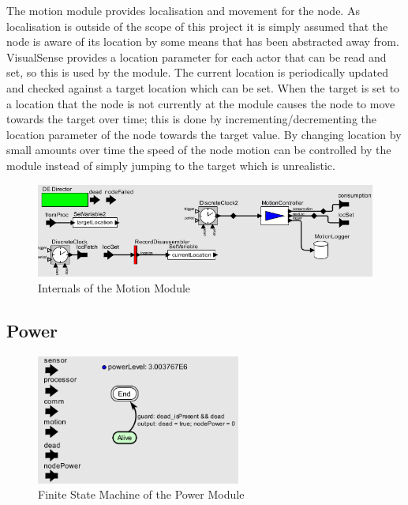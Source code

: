 \documentclass[authoryearcitations]{UoYCSproject}
\begin{document}
The motion module provides localisation and movement for the node. As localisation is outside of the scope of this project it is simply assumed that the node is aware of its location by some means that has been abstracted away from. VisualSense provides a location parameter for each actor that can be read and set, so this is used by the module. The current location is periodically updated and checked against a target location which can be set. When the target is set to a location that the node is not currently at the module causes the node to move towards the target over time; this is done by incrementing/decrementing the location parameter of the node towards the target value. By changing location by small amounts over time the speed of the node motion can be controlled by the module instead of simply jumping to the target which is unrealistic.

\begin{figure}
 \centering
    \includegraphics[width=\textwidth]{figures/motionInternals.png}
    \caption{Internals of the Motion Module}
    \label{fig:motionInternals}
\end{figure}

\subsection{Power}

\begin{figure}
 \centering
    \includegraphics[width=0.6\textwidth]{figures/power_Controller.png}
    \caption{Finite State Machine of the Power Module}
    \label{fig:powerControl}
\end{figure}
\end{document}
